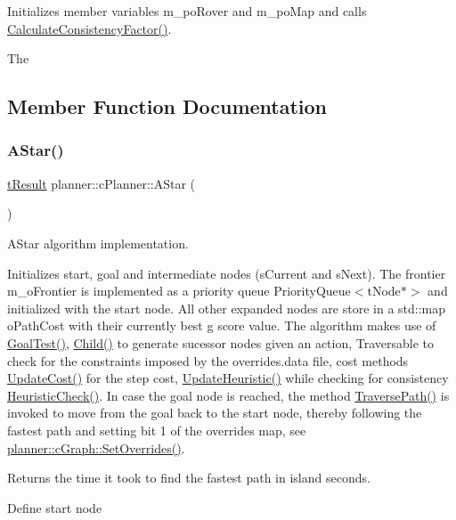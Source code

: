 Initializes member variables m\+\_\+po\+Rover and m\+\_\+po\+Map and calls \mbox{\hyperlink{classplanner_1_1c_planner_a2e5a745f83f903662eff914d8beddb5e}{Calculate\+Consistency\+Factor()}}. 

The 

\subsection{Member Function Documentation}
\mbox{\label{classplanner_1_1c_planner_a341e70531266f023ac9461d18979d1ef}} 
\subsubsection{\texorpdfstring{A\+Star()}{AStar()}\hspace{0.1cm}{\footnotesize\ttfamily [1/2]}}
{\footnotesize\ttfamily \mbox{\hyperlink{structt_result}{t\+Result}} planner\+::c\+Planner\+::\+A\+Star (\begin{DoxyParamCaption}{ }\end{DoxyParamCaption})\hspace{0.3cm}{\ttfamily [protected]}}



A\+Star algorithm implementation. 

Initializes start, goal and intermediate nodes (s\+Current and s\+Next). The frontier m\+\_\+o\+Frontier is implemented as a priority queue Priority\+Queue$<$t\+Node$\ast$$>$ and initialized with the start node. All other expanded nodes are store in a std\+::map o\+Path\+Cost with their currently best g score value. The algorithm makes use of \mbox{\hyperlink{classplanner_1_1c_planner_a6b7554394efd7ad10d76a49b370aa62f}{Goal\+Test()}}, \mbox{\hyperlink{classplanner_1_1c_planner_adbffc6ce05119c940a09369d7e61554e}{Child()}} to generate sucessor nodes given an action, Traversable to check for the constraints imposed by the overrides.\+data file, cost methods \mbox{\hyperlink{classplanner_1_1c_planner_a16e8c156297fff49a6ba9b97073baffb}{Update\+Cost()}} for the step cost, \mbox{\hyperlink{classplanner_1_1c_planner_ab7cc7c2666de2e49f745901080aac147}{Update\+Heuristic()}} while checking for consistency \mbox{\hyperlink{classplanner_1_1c_planner_a1234d075676fcaa2c17b859d11b4638c}{Heuristic\+Check()}}. In case the goal node is reached, the method \mbox{\hyperlink{classplanner_1_1c_planner_a8624cb2afb8f2fd216c38b4424013178}{Traverse\+Path()}} is invoked to move from the goal back to the start node, thereby following the fastest path and setting bit 1 of the overrides map, see \mbox{\hyperlink{classplanner_1_1c_graph_a6da6e6e269013628aef48245a7787cb9}{planner\+::c\+Graph\+::\+Set\+Overrides()}}. \begin{DoxyReturn}{Returns}
the time it took to find the fastest path in island seconds. 
\end{DoxyReturn}
Define start node

